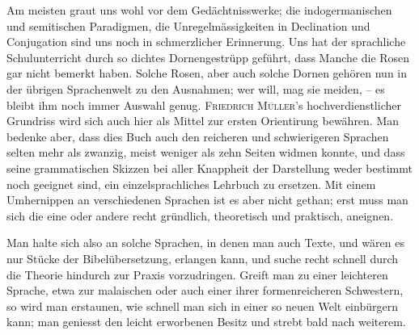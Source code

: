 \label{sp.51}

Am meisten graut uns wohl vor dem Gedächtnisswerke; die indogermanischen und semitischen Paradigmen, die Unregelmässigkeiten in Declination und Conjugation sind uns noch in schmerzlicher Erinnerung. Uns hat der sprachliche Schulunterricht durch so dichtes Dornengestrüpp geführt, dass Manche die Rosen gar nicht bemerkt haben. Solche Rosen, aber auch solche Dornen gehören nun in der übrigen Sprachenwelt zu den Ausnahmen; wer will, mag sie meiden, – es bleibt ihm noch immer Auswahl genug. \textsc{Friedrich Müller}’s hochverdienstlicher Grundriss wird sich auch hier als Mittel zur ersten Orientirung bewähren. Man bedenke aber, dass dies Buch auch den reicheren und schwierigeren Sprachen selten mehr als zwanzig, meist weniger als zehn Seiten widmen konnte, und dass seine grammatischen Skizzen bei aller Knappheit der Darstellung weder bestimmt noch geeignet sind, ein einzelsprachliches Lehrbuch zu ersetzen. Mit einem Umhernippen an verschiedenen Sprachen \label{fp.52} ist es aber nicht gethan; erst muss man sich die eine oder andere recht gründlich, theoretisch und praktisch, aneignen. 

Man halte sich also an solche Sprachen, in denen man auch Texte, und wären es nur Stücke der Bibelübersetzung, erlangen kann, und suche recht schnell durch die Theorie hindurch zur Praxis vorzudringen. Greift man zu einer leichteren Sprache, etwa zur malaischen oder auch einer ihrer formenreicheren Schwestern, so wird man erstaunen, wie schnell man sich in einer so neuen Welt einbürgern kann; man geniesst den leicht erworbenen Besitz und strebt bald nach weiterem. 


